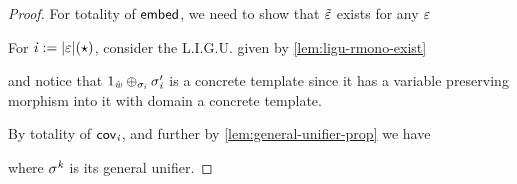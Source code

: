 \begin{proof}
    For totality of $\mathsf{embed}$, we need to show that $\tilde{\varepsilon}$ exists for any $\varepsilon$ 

    For $\mathit{i} := |{\varepsilon}|(\star)$, consider the L.I.G.U. given by \cref{lem:ligu-rmono-exist}
    and notice that $1_{\hat{\mathit{w}}} \oplus_{\sigma_{\mathit{i}}} \sigma_{\mathit{i}}'$ is a concrete template since it has a variable preserving morphism into it with domain a concrete template.
   
    By totality of $\mathsf{cov}_{\mathit{i}}$, and further by \cref{lem:general-unifier-prop} we have
    where $\sigma^{\mathit{k}}$ is its general unifier.
     

\end{proof}
